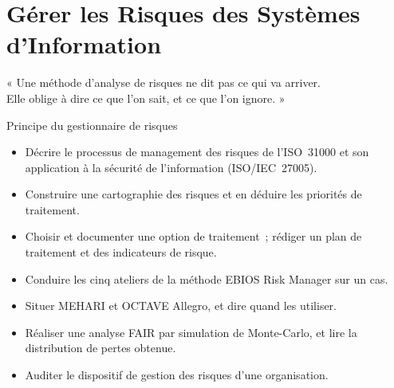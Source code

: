 
\chapter{Gérer les Risques des Systèmes d'Information}
\label{chap:gestion-risques}

\epigraph{%
    « Une méthode d'analyse de risques ne dit pas ce qui va arriver.\\
    Elle oblige à dire ce que l'on sait, et ce que l'on ignore. »%
}{Principe du gestionnaire de risques}


\begin{boxobjectifs}
\begin{itemize}
    \item Décrire le processus de management des risques de l'ISO~31000 et
          son application à la sécurité de l'information (ISO/IEC~27005).
    \item Construire une cartographie des risques et en déduire les
          priorités de traitement.
    \item Choisir et documenter une option de traitement~; rédiger un plan
          de traitement et des indicateurs de risque.
    \item Conduire les cinq ateliers de la méthode EBIOS Risk Manager sur un
          cas.
    \item Situer MEHARI et OCTAVE Allegro, et dire quand les utiliser.
    \item Réaliser une analyse FAIR par simulation de Monte-Carlo, et lire
          la distribution de pertes obtenue.
    \item Auditer le dispositif de gestion des risques d'une organisation.
\end{itemize}
\end{boxobjectifs}

